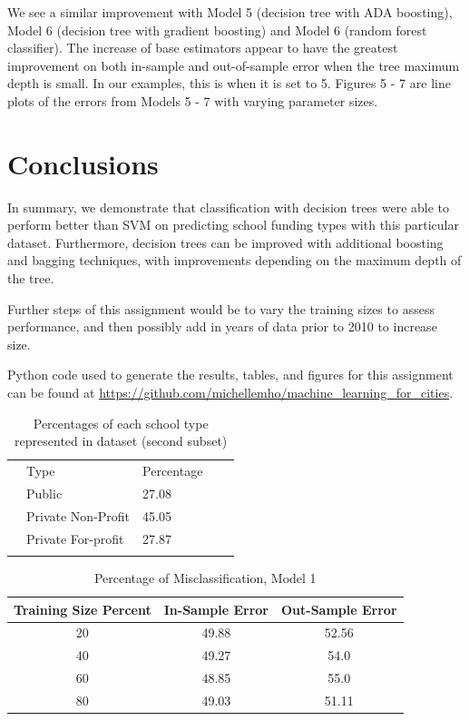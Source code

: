 \documentclass[10pt,twocolumn]{article}
\begin{document}
We see a similar improvement with Model 5 (decision tree with ADA boosting), Model 6
(decision tree with gradient boosting) and
Model 6 (random forest classifier). The increase of base estimators appear to have
the greatest improvement on both in-sample and out-of-sample error when the tree
maximum depth is small. In our examples, this is when it is set to 5. Figures 5 - 7
are line plots of the errors from Models 5 - 7 with varying parameter sizes.

\section{Conclusions}

In summary, we demonstrate that classification with decision trees
were able to perform better than SVM on predicting school funding types
with this particular dataset. Furthermore, decision trees can be improved
with additional boosting and bagging techniques, with improvements
depending on the maximum depth of the tree.

Further steps of this assignment would be to vary the training sizes to assess
performance, and then possibly add in years of data prior to 2010 to increase size.

Python code used to generate the results, tables, and figures for this assignment can be
found at \url{https://github.com/michellemho/machine_learning_for_cities}.


\begin{table}[ht]
\centering
\caption{Percentages of each school type represented in dataset (second subset)}
\label{my-label}
\begin{tabular}{lllll}
& Type                & Percentage &\\
& Public              & 27.08            & \\
& Private Non-Profit  & 45.05    & \\
& Private For-profit  & 27.87  & \\
                &                           &
\end{tabular}
\end{table}

\begin{table}[ht]
\caption{Percentage of Misclassification, Model 1} %
\centering %
\begin{tabularx}{\columnwidth}{c c c} %
\hline
Training Size Percent & In-Sample Error & Out-Sample Error \\ [0.5ex] %
\hline %
20 & 49.88 & 52.56 \\ %
40 & 49.27 & 54.0 \\
60 & 48.85 & 55.0 \\
80 & 49.03 & 51.11 \\ [1ex] %
\hline %
\end{tabularx}
\label{table:model1}
\end{table}
\end{document}
